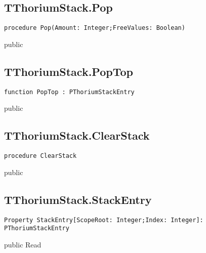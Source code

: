 \subsection{TThoriumStack.Pop}
\label{thoriumcorepkg:thorium:tthoriumstack:pop}
\begin{FPCList}
\Declaration 

\begin{verbatim}
procedure Pop(Amount: Integer;FreeValues: Boolean)
\end{verbatim}
\Visibility
public
\end{FPCList}
\subsection{TThoriumStack.PopTop}
\label{thoriumcorepkg:thorium:tthoriumstack:poptop}
\begin{FPCList}
\Declaration 

\begin{verbatim}
function PopTop : PThoriumStackEntry
\end{verbatim}
\Visibility
public
\end{FPCList}
\subsection{TThoriumStack.ClearStack}
\label{thoriumcorepkg:thorium:tthoriumstack:clearstack}
\begin{FPCList}
\Declaration 

\begin{verbatim}
procedure ClearStack
\end{verbatim}
\Visibility
public
\end{FPCList}
\subsection{TThoriumStack.StackEntry}
\label{thoriumcorepkg:thorium:tthoriumstack:stackentry}
\begin{FPCList}
\Declaration 

\begin{verbatim}
Property StackEntry[ScopeRoot: Integer;Index: Integer]: PThoriumStackEntry
\end{verbatim}
\Visibility
public
\Access
Read
\end{FPCList}
